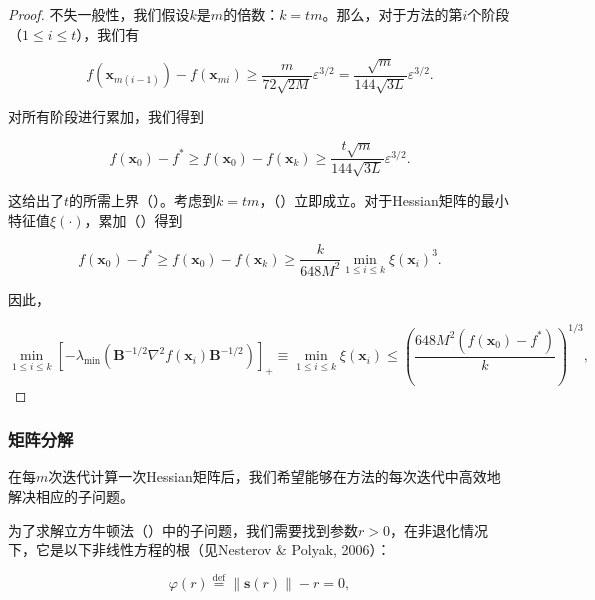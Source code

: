 \documentclass[a4paper,twoside,AutoFakeBold]{article}
\theoremstyle{definition}
\begin{document}
\begin{proof}
不失一般性，我们假设\(k\)是\(m\)的倍数：\(k = tm\)。那么，对于方法的第\(i\)个阶段（\(1 \leq i \leq t\)），我们有

\begin{equation}\label{B.56}
f(\mathbf{x}_{m(i-1)}) - f(\mathbf{x}_{mi}) \geq \frac{m}{72\sqrt{2M}} \varepsilon^{3/2} = \frac{\sqrt{m}}{144\sqrt{3L}} \varepsilon^{3/2}. \tag{B.56}
\end{equation}

对所有阶段进行累加，我们得到

\begin{equation}\label{B.57}
f(\mathbf{x}_0) - f^* \geq f(\mathbf{x}_0) - f(\mathbf{x}_k) \geq \frac{t\sqrt{m}}{144\sqrt{3L}} \varepsilon^{3/2}. \tag{B.57}
\end{equation}

这给出了\(t\)的所需上界（）。考虑到\(k = tm\)，（）立即成立。对于Hessian矩阵的最小特征值\(\xi(\cdot)\)，累加（）得到

\begin{equation}\label{B.58}
f(\mathbf{x}_0) - f^* \geq f(\mathbf{x}_0) - f(\mathbf{x}_k) \geq \frac{k}{648M^2} \min_{1 \leq i \leq k} \xi(\mathbf{x}_i)^3. \tag{B.58}
\end{equation}

因此，

\[
\min_{1 \leq i \leq k} \left[ -\lambda_{\min} \left( \mathbf{B}^{-1/2} \nabla^2 f(\mathbf{x}_i) \mathbf{B}^{-1/2} \right) \right]_+ 
\equiv \min_{1 \leq i \leq k} \xi(\mathbf{x}_i) \leq \left( \frac{648M^2(f(\mathbf{x}_0) - f^*)}{k} \right)^{1/3},
\]

\end{proof}

\subsubsection{矩阵分解}\label{sec:3.2}

在每\(m\)次迭代计算一次Hessian矩阵后，我们希望能够在方法的每次迭代中高效地解决相应的子问题。

为了求解立方牛顿法（）中的子问题，我们需要找到参数\(r > 0\)，在非退化情况下，它是以下非线性方程的根（见Nesterov \& Polyak, 2006）：

\begin{equation}\label{24}
\varphi(r) \stackrel{\text{def}}{=} \|\mathbf{s}(r)\| - r = 0, \tag{24}
\end{equation}
\end{document}
